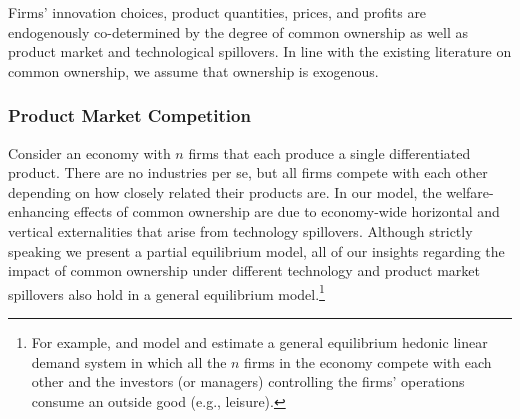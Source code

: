 \documentclass[12pt]{article}
\begin{document}
%

Firms' innovation choices, product quantities, prices, and profits are endogenously co-determined by the degree of common ownership as well as product market and technological spillovers. In line with the existing literature on common ownership, we assume that ownership is exogenous.

\subsubsection{Product Market Competition}

Consider an economy with $n$ firms that each produce a single differentiated product. There are no industries per se, but all firms compete with each other depending on how closely related their products are. In our model, the welfare-enhancing effects of common ownership are due to economy-wide horizontal and vertical externalities that arise from technology spillovers. Although strictly speaking we present a partial equilibrium model, all of our insights regarding the impact of common ownership under different technology and product market spillovers also hold in a general equilibrium model.\footnote{For example, \cite{pellegrino2019product} and \cite{ederer2021welfare} model and estimate a general equilibrium hedonic linear demand system in which all the $n$ firms in the economy compete with each other and the investors (or managers) controlling the firms' operations consume an outside good (e.g., leisure).}
\end{document}
